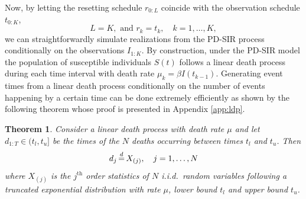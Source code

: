 \documentclass[11pt]{article}
\newtheorem{theorem}{Theorem}[section]
\begin{document}
	Now, by letting the resetting schedule $r_{0:L}$ coincide with the observation schedule $t_{0:K}$,
	$$L = K, \text{ and } r_k = t_k, \quad k=1,\dots,K,$$
	we can straightforwardly simulate realizations from the PD-SIR process conditionally on the observations $I_{1:K}$. By construction, under the PD-SIR model the population of susceptible individuals $S(t)$ follows a linear death process during each time interval with death rate $\mu_k = \beta I(t_{k-1})$. Generating event times from a linear death process conditionally on the number of events happening by a certain time can be done extremely efficiently as shown by the following theorem whose proof is presented in Appendix \ref{app:ldp}.
	
	\begin{theorem}
		\label{theo:ldp}
		Consider a linear death process with death rate $\mu$ and let $d_{1:T} \in (t_l, t_u]$ be the times of the $N$ deaths occurring between times $t_l$ and $t_u$. Then 
		$$d_j \,{\buildrel d \over =}\, X_{(j)}, \quad j = 1, \dots, N$$
		where $X_{(j)}$ is the $j^{\text{th}}$ order statistics of $N$ i.i.d.\ random variables following a truncated exponential distribution with rate $\mu$, lower bound $t_l$ and upper bound $t_u$.
	\end{theorem}
	
\end{document}
